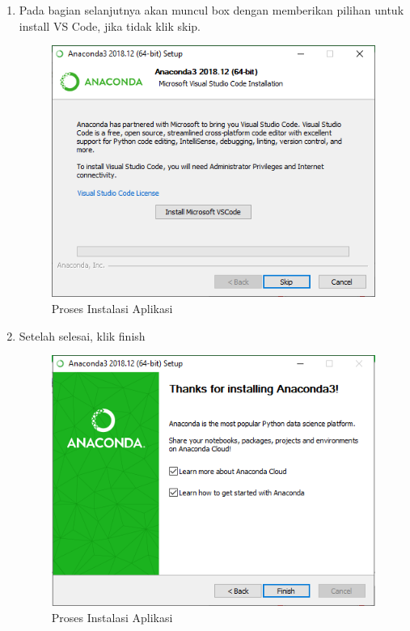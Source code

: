 \begin{enumerate}
\item Pada bagian selanjutnya akan muncul box dengan memberikan pilihan untuk install VS Code,  jika tidak klik skip.
\begin{figure}[ht]
\centering
\includegraphics[scale=0.7]{figures/9.png}
\caption{Proses Instalasi Aplikasi}
\end{figure}

\item Setelah selesai, klik finish
\begin{figure}[ht]
\centering
\includegraphics[scale=0.7]{figures/10.png}
\caption{Proses Instalasi Aplikasi}
\end{figure}


\end{enumerate}
